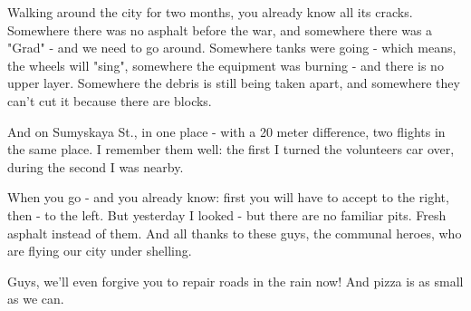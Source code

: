  
 
 
 
 

Walking around the city for two months, you already know all its cracks.
Somewhere there was no asphalt before the war, and somewhere there was a "Grad"
- and we need to go around. Somewhere tanks were going - which means, the
wheels will "sing", somewhere the equipment was burning - and there is no upper
layer. Somewhere the debris is still being taken apart, and somewhere they
can't cut it because there are blocks.

And on Sumyskaya St., in one place - with a 20 meter difference, two flights in
the same place. I remember them well: the first I turned the volunteers car
over, during the second I was nearby.

When you go - and you already know: first you will have to accept to the right,
then - to the left. But yesterday I looked - but there are no familiar pits.
Fresh asphalt instead of them. And all thanks to these guys, the communal
heroes, who are flying our city under shelling.

Guys, we'll even forgive you to repair roads in the rain now! And pizza is as
small as we can.
